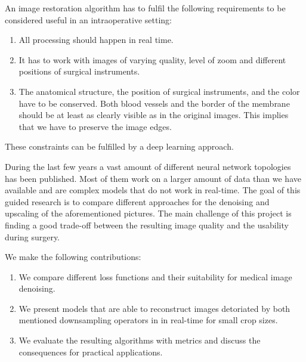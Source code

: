 \documentclass{scrartcl}
\begin{document}
An image restoration algorithm has to fulfil the following requirements to be considered useful in an intraoperative setting:
\begin{enumerate}
\item All processing should happen in real time.
\item It has to work with images of varying quality, level of zoom and different positions of surgical instruments.
\item The anatomical structure, the position of surgical instruments, and the color have to be conserved.
Both blood vessels and the border of the membrane should be at least as clearly visible as in the original images.
This implies that we have to preserve the image edges.
\end{enumerate}
These constraints can be fulfilled by a deep learning approach.

During the last few years a vast amount of different neural network topologies has been published.
Most of them work on a larger amount of data than we have available and are complex models that do not work in real-time.
The goal of this guided research is to compare different approaches for the denoising and upscaling of the aforementioned pictures.
The main challenge of this project is finding a good trade-off between the resulting image quality and the usability during surgery.

We make the following contributions:
\begin{enumerate}
\item We compare different loss functions and their suitability for medical image denoising.
\item We present models that are able to reconstruct images detoriated by both mentioned downsampling operators in in real-time for small crop sizes.
\item We evaluate the resulting algorithms with metrics and discuss the consequences for practical applications.
\end{enumerate}

\end{document}
